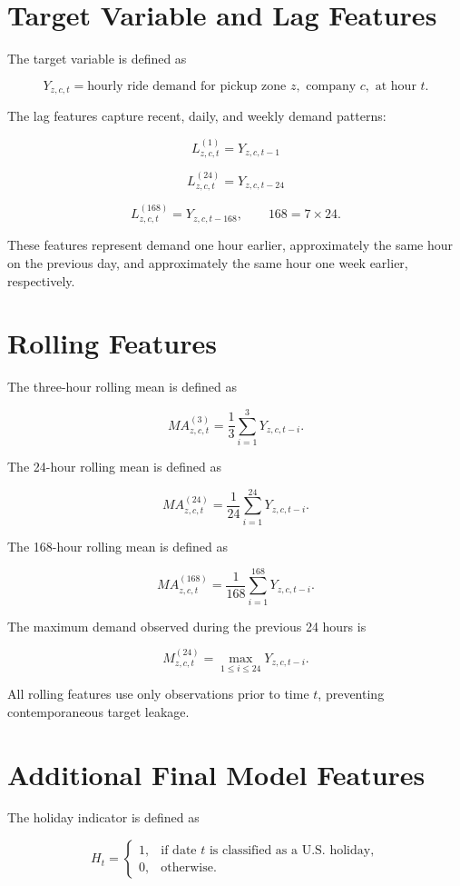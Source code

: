 \documentclass{article}
\begin{document}
\section{Target Variable and Lag Features}

The target variable is defined as

\[
Y_{z,c,t}
=
\text{hourly ride demand for pickup zone } z,
\text{ company } c,
\text{ at hour } t.
\]

The lag features capture recent, daily, and weekly demand patterns:

\[
L^{(1)}_{z,c,t}
=
Y_{z,c,t-1}
\]

\[
L^{(24)}_{z,c,t}
=
Y_{z,c,t-24}
\]

\[
L^{(168)}_{z,c,t}
=
Y_{z,c,t-168},
\qquad
168 = 7 \times 24.
\]

These features represent demand one hour earlier, approximately
the same hour on the previous day, and approximately the same hour
one week earlier, respectively.


\section{Rolling Features}

The three-hour rolling mean is defined as

\[
MA^{(3)}_{z,c,t}
=
\frac{1}{3}
\sum_{i=1}^{3}
Y_{z,c,t-i}.
\]

The 24-hour rolling mean is defined as

\[
MA^{(24)}_{z,c,t}
=
\frac{1}{24}
\sum_{i=1}^{24}
Y_{z,c,t-i}.
\]

The 168-hour rolling mean is defined as

\[
MA^{(168)}_{z,c,t}
=
\frac{1}{168}
\sum_{i=1}^{168}
Y_{z,c,t-i}.
\]

The maximum demand observed during the previous 24 hours is

\[
M^{(24)}_{z,c,t}
=
\max_{1 \leq i \leq 24}
Y_{z,c,t-i}.
\]

All rolling features use only observations prior to time $t$,
preventing contemporaneous target leakage.


\section{Additional Final Model Features}

The holiday indicator is defined as

\[
H_t =
\begin{cases}
1, & \text{if date } t \text{ is classified as a U.S. holiday},\\
0, & \text{otherwise}.
\end{cases}
\]
\end{document}
